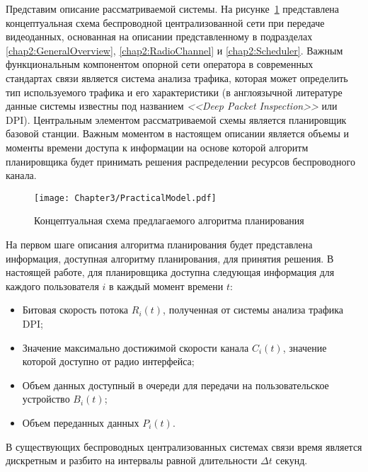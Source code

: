 Представим описание рассматриваемой системы. На рисунке~\ref{fig:PracticalModel} представлена концептуальная схема беспроводной централизованной сети при передаче видеоданных, основанная на описании представленному в подразделах \ref{chap2:GeneralOverview}, \ref{chap2:RadioChannel} и \ref{chap2:Scheduler}. Важным функциональным компонентом опорной сети оператора в современных стандартах связи является система анализа трафика, которая может определить тип используемого трафика и его характеристики (в англоязычной литературе данные системы известны под названием \textit{<<Deep Packet Inspection>>} или DPI). Центральным элементом рассматриваемой схемы является планировщик базовой станции. Важным моментом в настоящем описании является объемы и моменты времени доступа к информации на основе которой алгоритм планировщика будет принимать решения распределении ресурсов беспроводного канала.

\begin{figure}[htbp]
\begin{center}
\texttt{[image: Chapter3/PracticalModel.pdf]}
\caption{Концептуальная схема предлагаемого алгоритма планирования}
\label{fig:PracticalModel}
\end{center}
\end{figure}

На первом шаге описания алгоритма планирования будет представлена информация, доступная алгоритму планирования, для принятия решения. В настоящей работе, для планировщика доступна следующая информация для каждого пользователя $i$ в каждый момент времени $t$:
\begin{itemize}
	\item Битовая скорость потока $R_i(t)$, полученная от системы анализа трафика DPI;
	\item Значение максимально достижимой скорости канала $C_i(t)$, значение которой доступно от радио интерфейса;
	\item Объем данных доступный в очереди для передачи на пользовательское устройство $B_i(t)$;
	\item Объем переданных данных $P_i(t)$.
\end{itemize}
В существующих беспроводных централизованных системах связи время является дискретным и разбито на интервалы равной длительности $\Delta t$ секунд.

